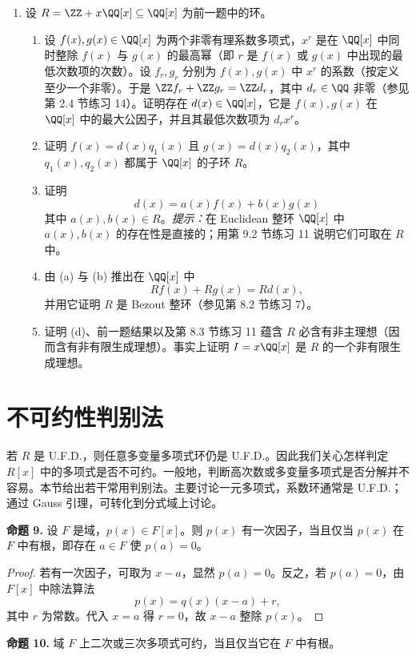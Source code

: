 \begin{enumerate}[label=\arabic*.]
	\item 设 $R=\ZZ+x\QQ[x]\subseteq\QQ[x]$ 为前一题中的环。
	\begin{enumerate}[label=(\alph*)]
		\item 设 $f(x),g(x)\in\QQ[x]$ 为两个非零有理系数多项式，$x^r$ 是在 $\QQ[x]$ 中同时整除 $f(x)$ 与 $g(x)$ 的最高幂（即 $r$ 是 $f(x)$ 或 $g(x)$ 中出现的最低次数项的次数）。设 $f_r,g_r$ 分别为 $f(x),g(x)$ 中 $x^r$ 的系数（按定义至少一个非零）。于是 $\ZZ f_r+\ZZ g_r=\ZZ d_r$，其中 $d_r\in\QQ$ 非零（参见第 2.4 节练习 14）。证明存在 $d(x)\in\QQ[x]$，它是 $f(x),g(x)$ 在 $\QQ[x]$ 中的最大公因子，并且其最低次数项为 $d_r x^r$。
		\item 证明 $f(x)=d(x)q_1(x)$ 且 $g(x)=d(x)q_2(x)$，其中 $q_1(x),q_2(x)$ 都属于 $\QQ[x]$ 的子环 $R$。
		\item 证明
		\[
		d(x)=a(x)f(x)+b(x)g(x)
		\]
		其中 $a(x),b(x)\in R$。\emph{提示：}在 Euclidean 整环 $\QQ[x]$ 中 $a(x),b(x)$ 的存在性是直接的；用第 9.2 节练习 11 说明它们可取在 $R$ 中。
		\item 由 (a) 与 (b) 推出在 $\QQ[x]$ 中
		\[
		Rf(x)+Rg(x)=Rd(x),
		\]
		并用它证明 $R$ 是 Bezout 整环（参见第 8.2 节练习 7）。
		\item 证明 (d)、前一题结果以及第 8.3 节练习 11 蕴含 $R$ 必含有非主理想（因而含有非有限生成理想）。事实上证明 $I=x\QQ[x]$ 是 $R$ 的一个非有限生成理想。
	\end{enumerate}
\end{enumerate}

\section{不可约性判别法}

若 $R$ 是 U.F.D.，则任意多变量多项式环仍是 U.F.D.。因此我们关心怎样判定 $R[x]$ 中的多项式是否不可约。一般地，判断高次数或多变量多项式是否分解并不容易。本节给出若干常用判别法。主要讨论一元多项式，系数环通常是 U.F.D.；通过 Gauss 引理，可转化到分式域上讨论。

\noindent\textbf{命题 9.} 设 $F$ 是域，$p(x)\in F[x]$。则 $p(x)$ 有一次因子，当且仅当 $p(x)$ 在 $F$ 中有根，即存在 $a\in F$ 使 $p(a)=0$。

\begin{proof}
	若有一次因子，可取为 $x-a$，显然 $p(a)=0$。反之，若 $p(a)=0$，由 $F[x]$ 中除法算法
	\[
	p(x)=q(x)(x-a)+r,
	\]
	其中 $r$ 为常数。代入 $x=a$ 得 $r=0$，故 $x-a$ 整除 $p(x)$。
\end{proof}

\noindent\textbf{命题 10.} 域 $F$ 上二次或三次多项式可约，当且仅当它在 $F$ 中有根。

